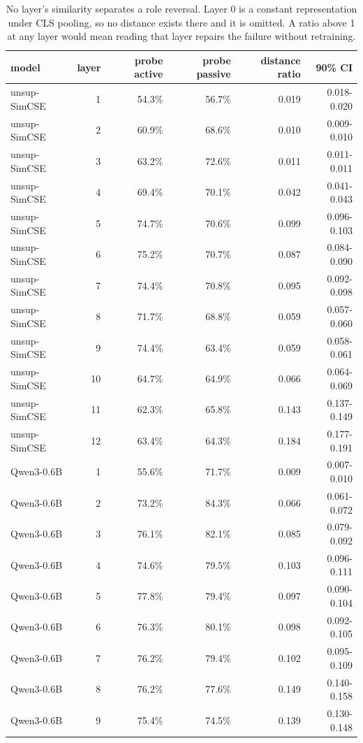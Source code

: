 \begin{table}[t]
\centering
\small
\caption{No layer's similarity separates a role reversal. Layer 0 is a constant representation under CLS pooling, so no distance exists there and it is omitted. A ratio above 1 at any layer would mean reading that layer repairs the failure without retraining.}
\begin{tabular}{lrrrrr}
\toprule
model & layer & probe active & probe passive & distance ratio & 90\% CI \\
\midrule
unsup-SimCSE & 1 & 54.3\% & 56.7\% & 0.019 & 0.018-0.020 \\
unsup-SimCSE & 2 & 60.9\% & 68.6\% & 0.010 & 0.009-0.010 \\
unsup-SimCSE & 3 & 63.2\% & 72.6\% & 0.011 & 0.011-0.011 \\
unsup-SimCSE & 4 & 69.4\% & 70.1\% & 0.042 & 0.041-0.043 \\
unsup-SimCSE & 5 & 74.7\% & 70.6\% & 0.099 & 0.096-0.103 \\
unsup-SimCSE & 6 & 75.2\% & 70.7\% & 0.087 & 0.084-0.090 \\
unsup-SimCSE & 7 & 74.4\% & 70.8\% & 0.095 & 0.092-0.098 \\
unsup-SimCSE & 8 & 71.7\% & 68.8\% & 0.059 & 0.057-0.060 \\
unsup-SimCSE & 9 & 74.4\% & 63.4\% & 0.059 & 0.058-0.061 \\
unsup-SimCSE & 10 & 64.7\% & 64.9\% & 0.066 & 0.064-0.069 \\
unsup-SimCSE & 11 & 62.3\% & 65.8\% & 0.143 & 0.137-0.149 \\
unsup-SimCSE & 12 & 63.4\% & 64.3\% & 0.184 & 0.177-0.191 \\
Qwen3-0.6B & 1 & 55.6\% & 71.7\% & 0.009 & 0.007-0.010 \\
Qwen3-0.6B & 2 & 73.2\% & 84.3\% & 0.066 & 0.061-0.072 \\
Qwen3-0.6B & 3 & 76.1\% & 82.1\% & 0.085 & 0.079-0.092 \\
Qwen3-0.6B & 4 & 74.6\% & 79.5\% & 0.103 & 0.096-0.111 \\
Qwen3-0.6B & 5 & 77.8\% & 79.4\% & 0.097 & 0.090-0.104 \\
Qwen3-0.6B & 6 & 76.3\% & 80.1\% & 0.098 & 0.092-0.105 \\
Qwen3-0.6B & 7 & 76.2\% & 79.4\% & 0.102 & 0.095-0.109 \\
Qwen3-0.6B & 8 & 76.2\% & 77.6\% & 0.149 & 0.140-0.158 \\
Qwen3-0.6B & 9 & 75.4\% & 74.5\% & 0.139 & 0.130-0.148 \\

\end{tabular}
\end{table}
